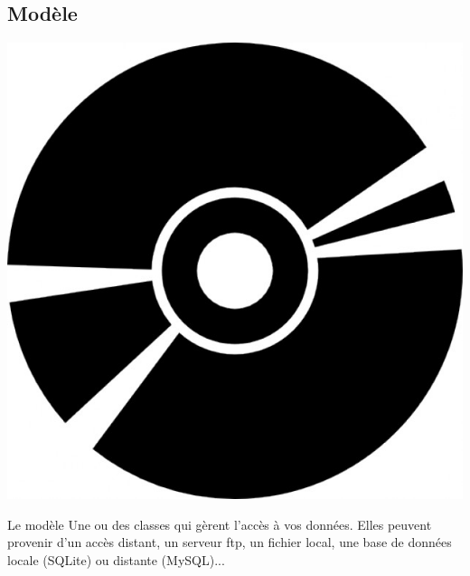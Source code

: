 \documentclass{beamer}
\begin{document}
\subsection{Modèle}
\begin{frame}
\begin{center}
\includegraphics[scale=0.2]{data.jpeg}
\end{center}
\begin{block}{Le modèle}
Une ou des classes qui gèrent l'accès à vos données. Elles peuvent provenir d'un accès distant, un serveur ftp, un fichier local, une base de données locale (SQLite) ou distante (MySQL)...
\end{block}
\end{frame}
\end{document}
